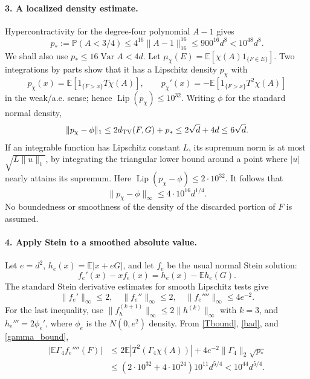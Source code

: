 \documentclass[11pt]{article}
\newcommand{\E}{\mathbb E}\newcommand{\Pp}{\mathbb P}\newcommand{\Ga}{\Gamma}
\begin{document}
\paragraph{3. A localized density estimate.}
Hypercontractivity for the degree-four polynomial $A-1$ gives
\begin{equation}\label{bad}
 p_*:=\Pp(A<3/4)\le4^{16}\|A-1\|_{16}^{16}
 \le900^{16}d^8<10^{48}d^8.
\end{equation}
We shall also use $p_*\le16\operatorname{Var}A<4d$.
Let $\mu_\chi(E)=\E[\chi(A)1_{\{F\in E\}}]$.
Two integrations by parts show that it has a Lipschitz density $p_\chi$ with
\[
 p_\chi(x)=\E[1_{\{F>x\}}T\chi(A)],\qquad
 p_\chi'(x)=-\E[1_{\{F>x\}}T^2\chi(A)]
\]
in the weak/a.e. sense; hence $\operatorname{Lip}(p_\chi)\le10^{32}$.
Writing $\phi$ for the standard normal density,
\[
 \|p_\chi-\phi\|_1\le2d_{\rm TV}(F,G)+p_*
 \le2\sqrt d+4d\le6\sqrt d.
\]
If an integrable function has Lipschitz constant $L$, its supremum norm is at most
$\sqrt{L\|u\|_1}$, by integrating the triangular lower bound around a point
where $|u|$ nearly attains its supremum. Here $\operatorname{Lip}(p_\chi-\phi)\le2\cdot10^{32}$. It follows that
\begin{equation}\label{density}
 \|p_\chi-\phi\|_\infty\le4\cdot10^{16}d^{1/4}.
\end{equation}
No boundedness or smoothness of the density of the discarded portion of $F$ is assumed.

\paragraph{4. Apply Stein to a smoothed absolute value.}
Let $e=d^2$, $h_e(x)=\E|x+eG|$, and let $f_e$ be the usual normal Stein solution:
\[
 f_e'(x)-xf_e(x)=h_e(x)-\E h_e(G).
\]
The standard Stein derivative estimates for smooth Lipschitz tests give
\[
 \|f_e'\|_\infty\le2,\quad \|f_e''\|_\infty\le2,\quad
 \|f_e''''\|_\infty\le4e^{-2}.
\]
For the last inequality, use $\|f_h^{(k+1)}\|_\infty\le2\|h^{(k)}\|_\infty$
with $k=3$, and $h_e'''=2\phi_e'$, where $\phi_e$ is the $N(0,e^2)$ density.
From \eqref{Tbound}, \eqref{bad}, and \eqref{gamma_bound},
\begin{align*}
 |\E\Ga_4 f_e''''(F)|
 &\le2\E|T^2(\Ga_4\chi(A))|
       +4e^{-2}\|\Ga_4\|_2\sqrt{p_*}\\
 &\le (2\cdot10^{32}+4\cdot10^{24})10^{11}d^{5/4}
 <10^{44}d^{5/4}.
\end{align*}
\end{document}
